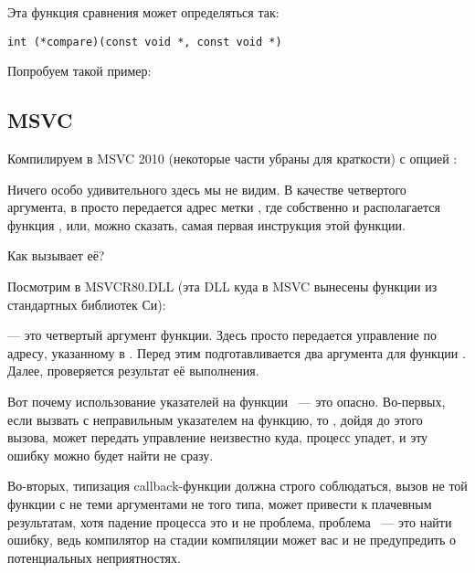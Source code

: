 Эта функция сравнения может определяться так:

\begin{lstlisting}
int (*compare)(const void *, const void *)
\end{lstlisting}

Попробуем такой пример:



\subsection{MSVC}

Компилируем в MSVC 2010 (некоторые части убраны для краткости) с опцией \TT{\Ox}:



Ничего особо удивительного здесь мы не видим. В качестве четвертого аргумента, 
в \qsort просто передается адрес метки , где собственно и располагается функция \comp,
или, можно сказать, самая первая инструкция этой функции.

Как \qsort вызывает её?

Посмотрим в MSVCR80.DLL (эта DLL куда в MSVC вынесены функции из стандартных библиотек Си):



 --- это четвертый аргумент функции. 
Здесь просто передается управление по адресу, указанному в . 
Перед этим подготавливается два аргумента для функции \comp. 
Далее, проверяется результат её выполнения.

Вот почему использование указателей на функции ~--- это опасно. 
Во-первых, если вызвать \qsort с неправильным указателем на функцию, 
то \qsort, дойдя до этого вызова, может передать управление неизвестно куда, 
процесс упадет, и эту ошибку можно будет найти не сразу.

Во-вторых, типизация callback-функции должна строго соблюдаться, 
вызов не той функции с не теми аргументами не того типа, 
может привести к плачевным результатам, 
хотя падение процесса это и не проблема, проблема ~--- это найти ошибку, ведь компилятор 
на стадии компиляции может вас и не предупредить о потенциальных неприятностях.

